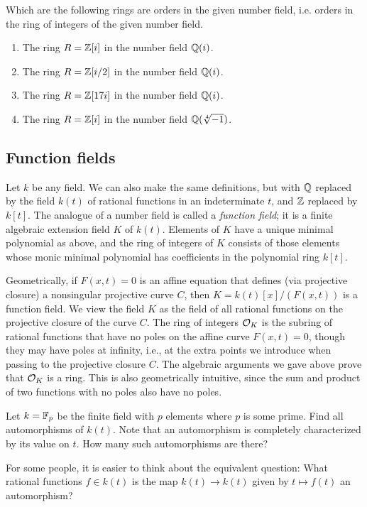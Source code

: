 \begin{exercise}
	Which are the following rings are orders in the given
	number field, i.e. orders in the ring of integers of the
	given number field.
	\begin{enumerate}[label=(\emph{\alph*})]
		\item The ring $R = \mathbb{Z}[i]$ in the number field $\mathbb{Q}(i)$.
		\item The ring $R = \mathbb{Z}[i/2]$ in the number field $\mathbb{Q}(i)$.
		\item The ring $R = \mathbb{Z}[17i]$ in the number field $\mathbb{Q}(i)$.
		\item The ring $R = \mathbb{Z}[i]$ in the number field $\mathbb{Q}(\sqrt[4]{-1})$.
	\end{enumerate}
\end{exercise}

\subsection{Function fields}
Let $k$ be any field.  We can also make the same definitions, but with $\mathbb{Q}$
replaced by the field $k(t)$ of rational functions in an indeterminate
$t$, and $\mathbb{Z}$ replaced by $k[t]$.
The analogue of a number field is called a {\em function field}; it is
a finite algebraic extension field $K$ of $k(t)$.  Elements of $K$
have a unique minimal polynomial as above, and the ring of integers of
$K$ consists of those elements whose monic minimal polynomial has
coefficients in the polynomial ring $k[t]$.

Geometrically, if $F(x,t)=0$ is an affine equation that defines (via
projective closure) a nonsingular projective curve $C$, then
$K=k(t)[x]/(F(x,t))$ is a function field.  We view the field $K$ as
the field of all rational functions on the projective closure of the
curve $C$.  The ring of integers $\mathcal{O}_K$ is the subring of rational
functions that have no poles on the affine curve $F(x,t)=0$, though
they may have poles at infinity, i.e., at the extra points we
introduce when passing to the projective closure $C$.  The algebraic
arguments we gave above prove that $\mathcal{O}_K$ is a ring.  This is also
geometrically intuitive, since the sum and product of two functions
with no poles also have no poles.

\begin{exercise}
	Let $k = \mathbb{F}_p$ be the finite field with $p$ elements where $p$ is some prime. Find all automorphisms of $k(t)$. Note that an automorphism is completely characterized by its value on $t$. How many such automorphisms are there?

	\begin{hint}
		For some people, it is easier to think about the equivalent question: What rational functions $f\in k(t)$ is the map $k(t)\to k(t)$ given by $t\mapsto f(t)$ an automorphism?
	\end{hint}
\end{exercise}

